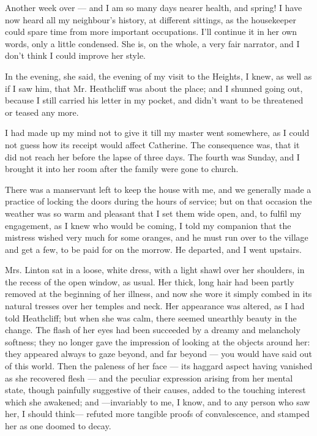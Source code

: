 \par Another week over — and I am so many days nearer health, and spring! I have now heard all my neighbour's history, at different sittings, as the housekeeper could spare time from more important occupations. I'll continue it in her own words, only a little condensed. She is, on the whole, a very fair narrator, and I don't think I could improve her style.
\par In the evening, she said, the evening of my visit to the Heights, I knew, as well as if I saw him, that Mr. Heathcliff was about the place; and I shunned going out, because I still carried his letter in my pocket, and didn't want to be threatened or teased any more.
\par I had made up my mind not to give it till my master went somewhere, as I could not guess how its receipt would affect Catherine. The consequence was, that it did not reach her before the lapse of three days. The fourth was Sunday, and I brought it into her room after the family were gone to church.
\par There was a manservant left to keep the house with me, and we generally made a practice of locking the doors during the hours of service; but on that occasion the weather was so warm and pleasant that I set them wide open, and, to fulfil my engagement, as I knew who would be coming, I told my companion that the mistress wished very much for some oranges, and he must run over to the village and get a few, to be paid for on the morrow. He departed, and I went upstairs.
\par Mrs. Linton sat in a loose, white dress, with a light shawl over her shoulders, in the recess of the open window, as usual. Her thick, long hair had been partly removed at the beginning of her illness, and now she wore it simply combed in its natural tresses over her temples and neck. Her appearance was altered, as I had told Heathcliff; but when she was calm, there seemed unearthly beauty in the change. The flash of her eyes had been succeeded by a dreamy and melancholy softness; they no longer gave the impression of looking at the objects around her: they appeared always to gaze beyond, and far beyond — you would have said out of this world. Then the paleness of her face — its haggard aspect having vanished as she recovered flesh — and the peculiar expression arising from her mental state, though painfully suggestive of their causes, added to the touching interest which she awakened; and —invariably to me, I know, and to any person who saw her, I should think— refuted more tangible proofs of convalescence, and stamped her as one doomed to decay.

